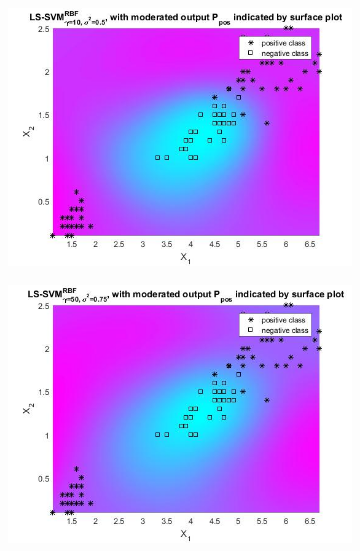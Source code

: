 \documentclass[11pt,oneside,a4paper]{article}
\begin{document}
\begin{figure}[H]
\begin{subfigure}[b]{0.4\textwidth}
		\includegraphics[width=\textwidth]{../Figures/gam_sig_dif}

	\end{subfigure}
	\begin{subfigure}[b]{0.4\textwidth}
		\includegraphics[width=\textwidth]{../Figures/gamma_50_bayes}

	\end{subfigure}
	
\end{figure}
\end{document}
